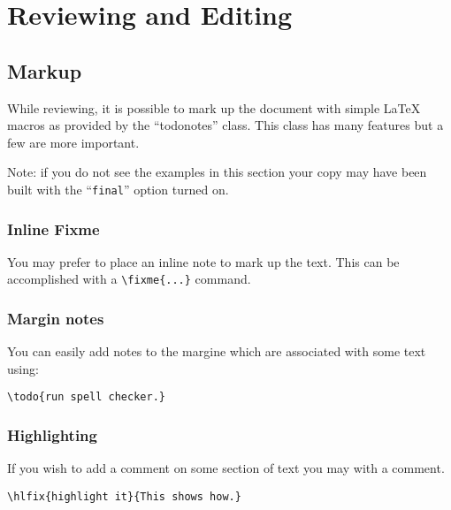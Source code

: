 \chapter{Reviewing and Editing}
\label{ch:review}

\section{Markup}

While reviewing, it is possible to mark up the document with simple
\LaTeX{} macros as provided by the ``todonotes'' class.
This class has many features but a few are more important.

Note: if you do not see the examples in this section your copy may
have been built with the ``\texttt{final}'' option turned on.


\subsection{Inline Fixme}

You may prefer to place an inline note to mark up the text.
This can be accomplished with a  \verb|\fixme{...}| command.

\subsection{Margin notes}

You can easily add notes to the margine  which
are associated with some text using:

\begin{verbatim}
\todo{run spell checker.}
\end{verbatim}


\subsection{Highlighting}

If you wish to add a comment on some section of text you may
with a comment.


\begin{verbatim}
\hlfix{highlight it}{This shows how.}
\end{verbatim}


